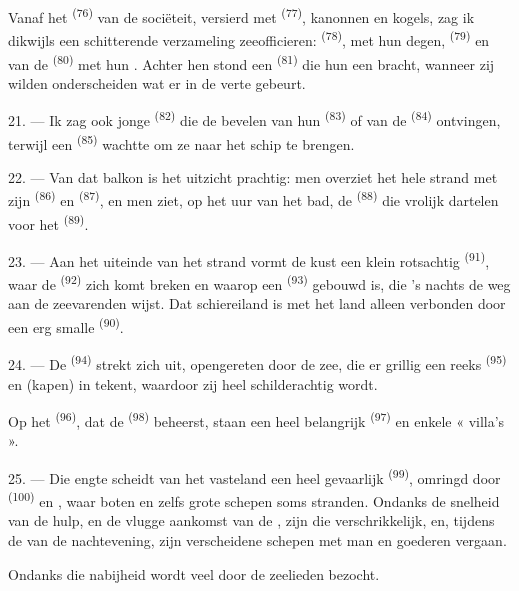 Vanaf het  \textsuperscript{(76)} van de sociëteit, versierd met
 \textsuperscript{(77)}, kanonnen en kogels, zag ik dikwijls een
schitterende verzameling zeeofficieren:  \textsuperscript{(78)}, met hun
degen,  \textsuperscript{(79)} en van de
 \textsuperscript{(80)} met hun . Achter hen stond een
 \textsuperscript{(81)} die hun een  bracht, wanneer zij
wilden onderscheiden wat er in de verte gebeurt.

21. --- Ik zag ook jonge  \textsuperscript{(82)} die de bevelen van
hun  \textsuperscript{(83)} of van de
 \textsuperscript{(84)} ontvingen, terwijl een
 \textsuperscript{(85)} wachtte om ze naar het schip te
brengen.

22. --- Van dat balkon is het uitzicht prachtig: men overziet het hele strand met zijn
 \textsuperscript{(86)} en  \textsuperscript{(87)}, en men
ziet, op het uur van het bad, de
 \textsuperscript{(88)} die vrolijk dartelen voor het
 \textsuperscript{(89)}.

23. --- Aan het uiteinde van het strand vormt de kust een klein rotsachtig
 \textsuperscript{(91)}, waar de 
\textsuperscript{(92)} zich komt breken en waarop een 
\textsuperscript{(93)} gebouwd is, die 's nachts de weg aan de zeevarenden wijst. Dat
schiereiland is met het land alleen verbonden door een erg smalle
 \textsuperscript{(90)}.

\VUsaut{3.0mm}
\VUsaut{3.0mm}

24. --- De  \textsuperscript{(94)} strekt zich uit, opengereten door de
zee, die er grillig een reeks  \textsuperscript{(95)} en 
(kapen) in tekent, waardoor zij heel schilderachtig wordt.

Op het  \textsuperscript{(96)}, dat de 
\textsuperscript{(98)} beheerst, staan een heel belangrijk 
\textsuperscript{(97)} en enkele « villa's ».

25. --- Die engte scheidt van het vasteland een heel gevaarlijk
 \textsuperscript{(99)}, omringd door 
\textsuperscript{(100)} en , waar boten en zelfs grote schepen soms stranden.
Ondanks de snelheid van de hulp, en de vlugge aankomst van de
, zijn die  verschrikkelijk, en,
tijdens de  van de nachtevening, zijn verscheidene schepen met man en goederen
vergaan.

Ondanks die nabijheid wordt  veel door de zeelieden bezocht.
\VUsaut{6.0mm}
\VUfilet{22mm}
